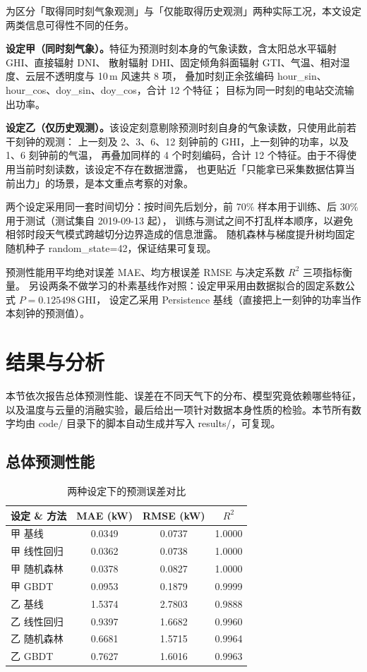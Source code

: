 \documentclass[11pt,a4paper]{ctexart}
\begin{document}
为区分「取得同时刻气象观测」与「仅能取得历史观测」两种实际工况，本文设定两类信息可得性不同的任务。

\textbf{设定甲（同时刻气象）。}特征为预测时刻本身的气象读数，含太阳总水平辐射 GHI、直接辐射 DNI、
散射辐射 DHI、固定倾角斜面辐射 GTI、气温、相对湿度、云层不透明度与 10\,m 风速共 8 项，
叠加时刻正余弦编码 hour\_sin、hour\_cos、doy\_sin、doy\_cos，合计 12 个特征；
目标为同一时刻的电站交流输出功率。

\textbf{设定乙（仅历史观测）。}该设定刻意剔除预测时刻自身的气象读数，只使用此前若干刻钟的观测：
上一刻及 2、3、6、12 刻钟前的 GHI，上一刻钟的功率，以及 1、6 刻钟前的气温，
再叠加同样的 4 个时刻编码，合计 12 个特征。由于不得使用当前时刻读数，该设定不存在数据泄露，
也更贴近「只能拿已采集数据估算当前出力」的场景，是本文重点考察的对象。

两个设定采用同一套时间切分：按时间先后划分，前 70\% 样本用于训练、后 30\% 用于测试（测试集自 2019-09-13 起），
训练与测试之间不打乱样本顺序，以避免相邻时段天气模式跨越切分边界造成的信息泄露。
随机森林与梯度提升树均固定随机种子 random\_state=42，保证结果可复现。

预测性能用平均绝对误差 MAE、均方根误差 RMSE 与决定系数 $R^2$ 三项指标衡量。
另设两条不做学习的朴素基线作对照：设定甲采用由数据拟合的固定系数公式 $P=0.125498\,\mathrm{GHI}$，
设定乙采用 Persistence 基线（直接把上一刻钟的功率当作本刻钟的预测值）。


\section{结果与分析}

本节依次报告总体预测性能、误差在不同天气下的分布、模型究竟依赖哪些特征，以及温度与云量的消融实验，最后给出一项针对数据本身性质的检验。本节所有数字均由 {\ttfamily code/} 目录下的脚本自动生成并写入 {\ttfamily results/}，可复现。

\subsection{总体预测性能}
\begin{table}[htbp]
\centering
\caption{两种设定下的预测误差对比}
\label{tab:metrics}
\begin{tabular}{lccc}
\toprule
设定 \& 方法 & MAE (kW) & RMSE (kW) & $R^2$ \\
\midrule
甲 基线 & 0.0349 & 0.0737 & 1.0000 \\
甲 线性回归 & 0.0362 & 0.0738 & 1.0000 \\
甲 随机森林 & 0.0378 & 0.0827 & 1.0000 \\
甲 GBDT & 0.0953 & 0.1879 & 0.9999 \\
乙 基线 & 1.5374 & 2.7803 & 0.9888 \\
乙 线性回归 & 0.9397 & 1.6682 & 0.9960 \\
乙 随机森林 & 0.6681 & 1.5715 & 0.9964 \\
乙 GBDT & 0.7627 & 1.6016 & 0.9963 \\
\bottomrule
\end{tabular}
\end{table}
\end{document}
